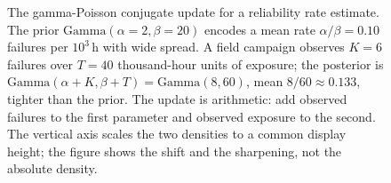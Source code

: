 \begin{figure}[ht]
\caption[Gamma-Poisson conjugate update of a failure rate]{The
gamma-Poisson conjugate update for a reliability rate estimate. The
prior $\text{Gamma}(\alpha = 2, \beta = 20)$ encodes a mean rate
$\alpha/\beta = 0.10$ failures per $10^{3}\,$h with wide spread. A
field campaign observes $K = 6$ failures over $T = 40$
thousand-hour units of exposure; the posterior is
$\text{Gamma}(\alpha + K, \beta + T) = \text{Gamma}(8, 60)$, mean
$8/60 \approx 0.133$, tighter than the prior. The update is
arithmetic: add observed failures to the first parameter and
observed exposure to the second. The vertical axis scales the two
densities to a common display height; the figure shows the shift
and the sharpening, not the absolute density.}
\label{fig:vol01:ch08:gamma-poisson-update}
\end{figure}
